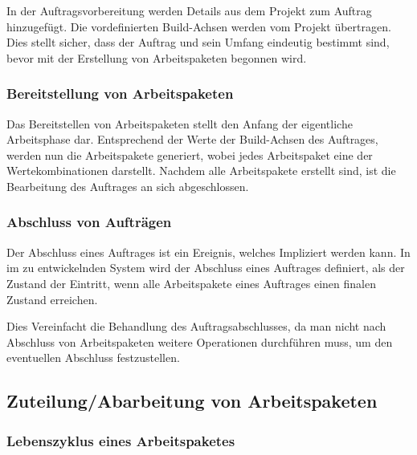 In der Auftragsvorbereitung werden Details aus dem Projekt zum Auftrag hinzugefügt.
Die vordefinierten Build-Achsen werden vom Projekt übertragen.
Dies stellt sicher, dass der Auftrag und sein Umfang eindeutig bestimmt sind,
bevor mit der Erstellung von Arbeitspaketen begonnen wird.


\subsubsection{Bereitstellung von Arbeitspaketen}

Das Bereitstellen von Arbeitspaketen stellt den Anfang der eigentliche Arbeitsphase dar.
Entsprechend der Werte der Build-Achsen des Auftrages, werden nun die Arbeitspakete generiert,
wobei jedes Arbeitspaket eine der Wertekombinationen darstellt.
Nachdem alle Arbeitspakete erstellt sind, ist die Bearbeitung des Auftrages an sich abgeschlossen.

\subsubsection{Abschluss von Aufträgen}

Der Abschluss eines Auftrages ist ein Ereignis, welches Impliziert werden kann.
In im zu entwickelnden System wird der Abschluss eines Auftrages definiert,
als der Zustand der Eintritt, wenn alle Arbeitspakete eines Auftrages
einen finalen Zustand erreichen.

Dies Vereinfacht die Behandlung des Auftragsabschlusses,
da man nicht nach Abschluss von Arbeitspaketen weitere Operationen durchführen muss,
um den eventuellen Abschluss festzustellen.

\subsection{Zuteilung/Abarbeitung von Arbeitspaketen}


\subsubsection{Lebenszyklus eines Arbeitspaketes}


